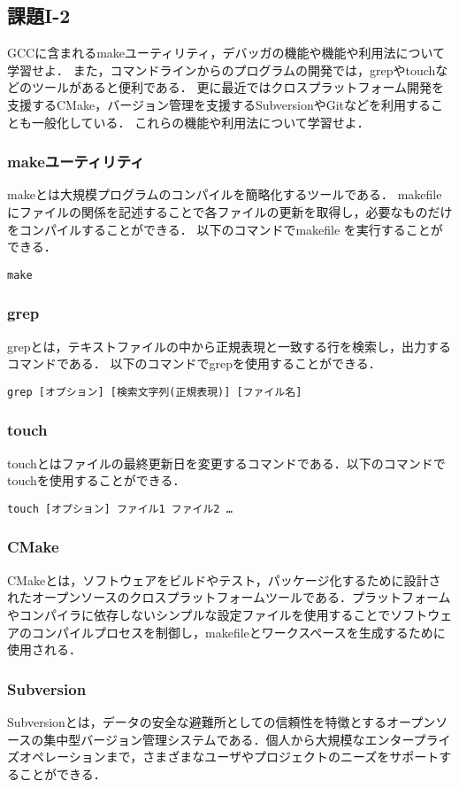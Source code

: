 \documentclass[]{jarticle}
\begin{document}
\subsection{課題I-2}
GCCに含まれるmakeユーティリティ，デバッガの機能や機能や利用法について学習せよ．
また，コマンドラインからのプログラムの開発では，grepやtouchなどのツールがあると便利である．
更に最近ではクロスプラットフォーム開発を支援するCMake，バージョン管理を支援するSubversionやGitなどを利用することも一般化している．
これらの機能や利用法について学習せよ．
% 
\subsubsection{makeユーティリティ}
makeとは大規模プログラムのコンパイルを簡略化するツールである．
makefileにファイルの関係を記述することで各ファイルの更新を取得し，必要なものだけをコンパイルすることができる．
以下のコマンドでmakefile を実行することができる．
\begin{lstlisting}[]
  make
\end{lstlisting}
% 
\subsubsection{grep}
grepとは，テキストファイルの中から正規表現と一致する行を検索し，出力するコマンドである．
以下のコマンドでgrepを使用することができる．
\begin{lstlisting}[]
grep [オプション] [検索文字列(正規表現)] [ファイル名]
\end{lstlisting}
% 
\subsubsection{touch}
touchとはファイルの最終更新日を変更するコマンドである．以下のコマンドでtouchを使用することができる．
\begin{lstlisting}[]
touch [オプション] ファイル1 ファイル2 …
\end{lstlisting}
% 
\subsubsection{CMake}
CMakeとは，ソフトウェアをビルドやテスト，パッケージ化するために設計されたオープンソースのクロスプラットフォームツールである．プラットフォームやコンパイラに依存しないシンプルな設定ファイルを使用することでソフトウェアのコンパイルプロセスを制御し，makefileとワークスペースを生成するために使用される．
% 
\subsubsection{Subversion}
Subversionとは，データの安全な避難所としての信頼性を特徴とするオープンソースの集中型バージョン管理システムである．個人から大規模なエンタープライズオペレーションまで，さまざまなユーザやプロジェクトのニーズをサポートすることができる．
% 
\end{document}
